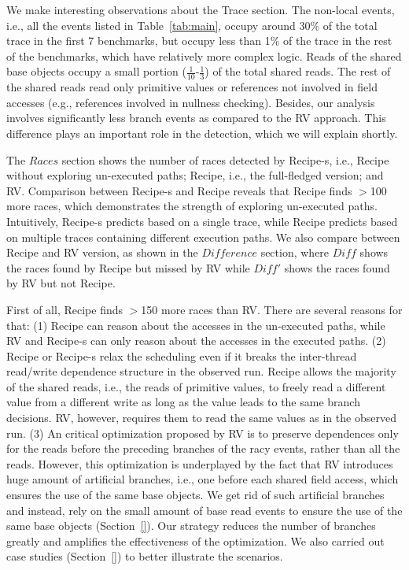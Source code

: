 We make interesting observations about the Trace section. The non-local events, i.e., all the events listed in Table~\ref{tab:main}, occupy around 30\% of the total trace in the first 7 benchmarks, but occupy less than 1\% of the trace in the rest of the benchmarks, which have relatively more complex logic. Reads of the shared base objects occupy a small portion ($\frac{1}{10}$-$\frac{1}{3}$) of the total shared reads. The rest of the shared reads read only primitive values or 
references not involved in field accesses (e.g., references involved in nullness checking). Besides, our analysis involves significantly less branch events as compared to the {\sf RV} approach. This difference plays an important role in the detection, which we will explain shortly.


The $Races$ section shows the number of races detected by {\sf Recipe-s}, i.e., {\sf Recipe} without exploring un-executed paths; {\sf Recipe}, i.e., the full-fledged version; and {\sf RV}. Comparison between {\sf Recipe-s} and {\sf Recipe} reveals that {\sf Recipe} finds $>$100 more races, which demonstrates the strength of exploring  un-executed paths. Intuitively,  {\sf Recipe-s} predicts based on a single trace, while {\sf Recipe} predicts based on multiple traces containing different execution paths. We also compare between {\sf Recipe} and {\sf RV} version, as shown in the $Difference$ section, where $Diff$ shows the races found by {\sf Recipe} but missed by {\sf RV} while $Diff'$ shows the races found by {\sf RV} but not {\sf Recipe}.

First of all, {\sf Recipe} finds $>$150 more races than {\sf RV}. There are several reasons for that: (1) {\sf Recipe} can reason about the accesses in the un-executed paths, while {\sf RV} and {\sf Recipe-s} can only reason about the accesses in the executed paths. (2) {\sf Recipe} or {\sf Recipe-s} relax the scheduling even if it breaks the inter-thread read/write dependence structure in the observed run. {\sf Recipe} allows the majority of the shared reads, i.e., the reads of primitive values, to freely read a different value from a different write as long as the value leads to the same branch decisions. {\sf RV}, however, requires them to read the same values as in the observed run. (3) An critical optimization proposed by {\sf RV} is to preserve dependences only for the reads before the preceding branches  of the racy events, rather than all the reads. However, this optimization is underplayed by the fact that {\sf RV} introduces huge amount of artificial branches, i.e., one before each shared field access, which ensures the use of the same base objects.
We get rid of such artificial branches and instead, rely on the small amount of base read events to ensure the use of the same base objects (Section~\ref{}). Our strategy reduces the number of branches greatly and amplifies the effectiveness of the optimization. We also carried out case studies (Section~\ref{}) to better illustrate the scenarios.

